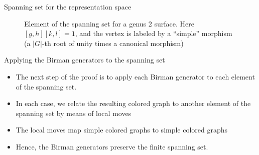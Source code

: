 \documentclass[final,t, mathserif]{beamer}
\theoremstyle{plain}
\theoremstyle{definition}
\newcommand{\R}{\mathbb{R}}
\begin{document}
\begin{frame}{}
\begin{columns}[t]
\begin{column}{.3\linewidth}
\begin{block}{Spanning set for the representation space}
\begin{figure}
\caption{Element of the spanning set for a genus 2 surface.  Here $[g,h][k,l] = 1$, and the vertex is labeled by a ``simple'' morphism (a $|G|$-th root of unity times a canonical morphism)}
\label{fig:span}
\end{figure}
\end{block}


\begin{block}{Applying the Birman generators to the spanning set}
\begin{itemize}
\item  The next step of the proof is to apply each Birman generator to each element of the spanning set.
\item  In each case, we relate the resulting colored graph to another element of the spanning set by means of local moves
\item  The local moves map simple colored graphs to simple colored graphs
\item Hence, the Birman generators preserve the finite spanning set.
\end{itemize}
\end{block}


\end{column}
\end{columns}
\end{frame}
\end{document}
